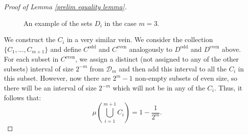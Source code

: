 \documentclass[10pt,a4paper]{amsart}
\begin{document}
\begin{proof}[Proof of Lemma \ref{prelim equality lemma}]
\begin{figure}[!ht]
    \caption{An example of the sets $D_i$ in the case $m=3$.}
    \label{leb construction Di}
\begin{center}
\end{center}
\label{Di set example m=3}
\end{figure}
    
    We construct the $C_i$ in a very similar vein. 
    We consider the collection $\{ C_1,...,C_{m+1} \}$ and define $C^{\textrm{odd}}$ and $C^{\textrm{even}}$ analogously to $D^{\textrm{odd}}$ and $D^{\textrm{even}}$ above. For each subset in $C^{\textrm{even}}$, we assign a distinct (not assigned to any of the other subsets) interval of size $2^{-m}$ from $\mathcal{D}_m$ and then add this interval to all the $C_i$ in this subset. However, now there are $2^m-1$ non-empty subsets of even size, so there will be an interval of size $2^{-m}$ which will not be in any of the $C_i$. Thus, it follows that:
     \[\mu \left( \bigcup_{i=1}^{m+1} C_i \right) =1-\frac{1}{2^m}.\]



\end{proof}
\end{document}
